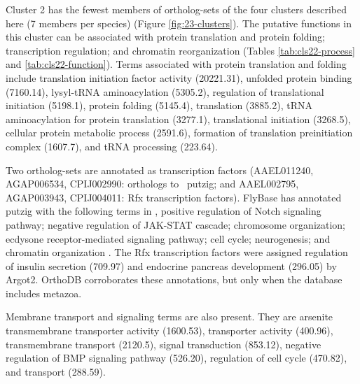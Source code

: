




Cluster 2 has the fewest members of ortholog-sets of the four clusters described here (7 members per species) (Figure \ref{fig:23-clusters}).
%
The putative functions in this cluster can be associated with protein translation and protein folding; transcription regulation; and chromatin reorganization (Tables \ref{tab:cls22-process} and \ref{tab:cls22-function}).
%
Terms associated with protein translation and folding include translation initiation factor activity (20221.31), unfolded protein binding (7160.14), lysyl-tRNA aminoacylation (5305.2), regulation of translational initiation (5198.1), protein folding (5145.4), translation (3885.2), tRNA aminoacylation for protein translation (3277.1), translational initiation (3268.5), cellular protein metabolic process (2591.6), formation of translation preinitiation complex (1607.7), and tRNA processing (223.64).




Two ortholog-sets are annotated as transcription factors (AAEL011240, AGAP006534, CPIJ002990: orthologs to \Dm\ putzig; and AAEL002795, AGAP003943, CPIJ004011: Rfx transcription factors).
%
FlyBase has annotated putzig with the following terms in \Dm, positive regulation of Notch signaling pathway; negative regulation of JAK-STAT cascade; chromosome organization; ecdysone receptor-mediated signaling pathway; cell cycle; neurogenesis; and chromatin organization \cite{Marygold2013}.
%
The Rfx transcription factors were assigned regulation of insulin secretion (709.97) and endocrine pancreas development (296.05) by \gls{Argot2}.
%
OrthoDB corroborates these annotations, but only when the database includes metazoa.

Membrane transport and signaling terms are also present.
%
They are arsenite transmembrane transporter activity (1600.53), transporter activity (400.96), transmembrane transport (2120.5), signal transduction (853.12), negative regulation of BMP signaling pathway (526.20), regulation of cell cycle (470.82), and transport (288.59).








